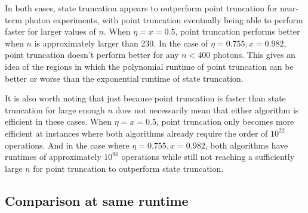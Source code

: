 In both cases, state truncation appears to outperform point truncation for near-term photon experiments, with point truncation eventually being able to perform faster for larger values of $n$. 
When $\eta=x=0.5$, point truncation performs better when $n$ is approximately larger than 230. 
In the case of $\eta=0.755, x=0.982$, point truncation doesn't perform better for any $n < 400$ photons. 
This gives an idea of the regions in which the polynomial runtime of point truncation can be better or worse than the exponential runtime of state truncation.

It is also worth noting that just because point truncation is faster than state truncation for large enough $n$ does not necessarily mean that either algorithm is efficient in these cases. 
When $\eta=x=0.5$, point truncation only becomes more efficient at instances where both algorithms already require the order of $10^{22}$ operations. 
And in the case where $\eta=0.755, x=0.982$, both algorithms have runtimes of approximately $10^{96}$ operations while still not reaching a sufficiently large $n$ for point truncation to outperform state truncation.


\subsection{Comparison at same runtime}
\label{subsec:same-runtime}

